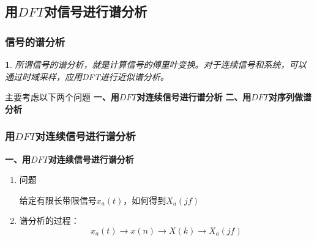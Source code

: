 \documentclass[notheorems,compress,mathserif,table]{beamer}
\newtheorem{dablock}{}
\begin{document}
\subsection[shrink]{用$DFT$对信号进行谱分析}
\begin{frame}\frametitle{信号的谱分析}%
\begin{dablock}
所谓信号的谱分析，就是计算信号的傅里叶变换。对于连续信号和系统，可以通过时域采样，应用DFT进行近似谱分析。
\end{dablock}
\quad \newline\quad 
主要考虑以下两个问题
\quad \newline\newline \quad 
\textbf{一、用$DFT$对连续信号进行谱分析}
\quad \newline\newline \quad 
\textbf{二、用$DFT$对序列做谱分析}
\end{frame}



\begin{frame}[shrink]\frametitle{用$DFT$对连续信号进行谱分析}%
\textbf{一、用$DFT$对连续信号进行谱分析}
\begin{enumerate}
  \item [(1)]  问题 \par
        给定有限长带限信号$x_a(t)$，如何得到$X_a(jf)$\newline


  \item [(2)]   谱分析的过程：
        $$x_a(t) \longrightarrow  x(n) \longrightarrow X(k) \longrightarrow X_a(jf)$$
\end{enumerate}
\end{frame}


%
\end{document}
